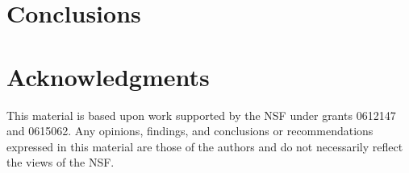 \documentclass[nocopyrightspace]{sigplanconf}
\begin{document}
\section{Conclusions}
\label{sec:conclusions}

\section*{Acknowledgments}

This material is based upon work 
supported by the NSF
   under grants 0612147 and 0615062.
Any opinions, findings, and conclusions or recommendations
   expressed in this material are those of the authors and do not
   necessarily reflect the views of the NSF.



\end{document}
